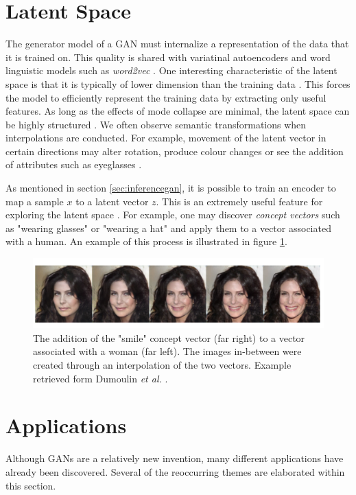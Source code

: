 \documentclass[11pt]{article}
\begin{document}
\section{Latent Space} \label{sed:latentspace}
The generator model of a GAN must internalize a representation of the data that it is trained on. This quality is shared with variatinal autoencoders and word linguistic models such as \textit{word2vec} \citep{2017arXiv171007035C}. One interesting characteristic of the latent space is that it is typically of lower dimension than the training data \citep{2017arXiv171007035C}. This forces the model to efficiently represent the training data by extracting only useful features. As long as the effects of mode collapse are minimal, the latent space can be highly structured \citep{2017arXiv171007035C}. We often observe semantic transformations when interpolations are conducted. For example, movement of the latent vector in certain directions may alter rotation, produce colour changes or see the addition of attributes such as eyeglasses \citep{2017arXiv171007035C}.

As mentioned in section \ref{sec:inferencegan}, it is possible to train an encoder to map a sample $x$ to a latent vector $z$. This is an extremely useful feature for exploring the latent space \citep{2017arXiv171007035C}. For example, one may discover \textit{concept vectors} such as "wearing glasses" or "wearing a hat" and apply them to a vector associated with a human. An example of this process is illustrated in figure \ref{fig:conceptvector}.

\begin{figure}
\centering
\includegraphics[scale=0.40]{smile_concept_vector}
\caption{The addition of the "smile" concept vector (far right) to a vector associated with a woman (far left). The images in-between were created through an interpolation of the two vectors. Example retrieved form Dumoulin \textit{et al.} \citep{2016arXiv160600704D}.}
\label{fig:conceptvector}
\end{figure}



\section{Applications} \label{sec:applications}
Although GANs are a relatively new invention, many different applications have already been discovered. Several of the reoccurring themes are elaborated within this section.
\end{document}
